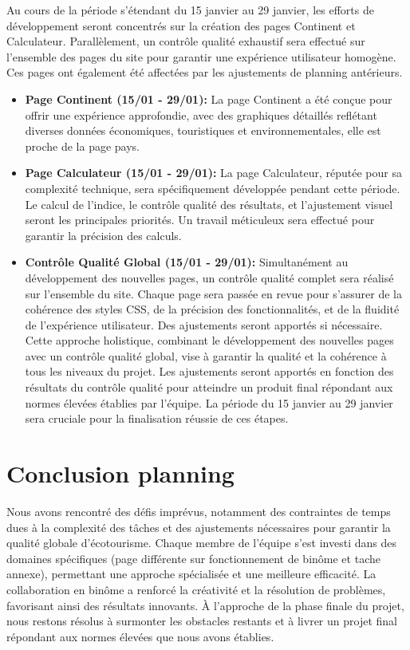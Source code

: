 \documentclass[mstat,12pt]{unswthesis}
\begin{document}
\begin{adjustwidth}{-2cm}{}
Au cours de la période s'étendant du 15 janvier au 29 janvier, les
efforts de développement seront concentrés sur la création des pages
Continent et Calculateur. Parallèlement, un contrôle qualité exhaustif
sera effectué sur l'ensemble des pages du site pour garantir une
expérience utilisateur homogène. Ces pages ont également été affectées
par les ajustements de planning antérieurs.

\begin{itemize}
\tightlist
\item
  \textbf{Page Continent (15/01 - 29/01):} La page Continent a été
  conçue pour offrir une expérience approfondie, avec des graphiques
  détaillés reflétant diverses données économiques, touristiques et
  environnementales, elle est proche de la page pays.
\item
  \textbf{Page Calculateur (15/01 - 29/01):} La page Calculateur,
  réputée pour sa complexité technique, sera spécifiquement développée
  pendant cette période. Le calcul de l'indice, le contrôle qualité des
  résultats, et l'ajustement visuel seront les principales priorités. Un
  travail méticuleux sera effectué pour garantir la précision des
  calculs.
\item
  \textbf{Contrôle Qualité Global (15/01 - 29/01):} Simultanément au
  développement des nouvelles pages, un contrôle qualité complet sera
  réalisé sur l'ensemble du site. Chaque page sera passée en revue pour
  s'assurer de la cohérence des styles CSS, de la précision des
  fonctionnalités, et de la fluidité de l'expérience utilisateur. Des
  ajustements seront apportés si nécessaire. Cette approche holistique,
  combinant le développement des nouvelles pages avec un contrôle
  qualité global, vise à garantir la qualité et la cohérence à tous les
  niveaux du projet. Les ajustements seront apportés en fonction des
  résultats du contrôle qualité pour atteindre un produit final
  répondant aux normes élevées établies par l'équipe. La période du 15
  janvier au 29 janvier sera cruciale pour la finalisation réussie de
  ces étapes.
\end{itemize}

\hypertarget{conclusion-planning}{%
\section{Conclusion planning}\label{conclusion-planning}}

Nous avons rencontré des défis imprévus, notamment des contraintes de
temps dues à la complexité des tâches et des ajustements nécessaires
pour garantir la qualité globale d'écotourisme. Chaque membre de
l'équipe s'est investi dans des domaines spécifiques (page différente
sur fonctionnement de binôme et tache annexe), permettant une approche
spécialisée et une meilleure efficacité. La collaboration en binôme a
renforcé la créativité et la résolution de problèmes, favorisant ainsi
des résultats innovants. À l'approche de la phase finale du projet, nous
restons résolus à surmonter les obstacles restants et à livrer un projet
final répondant aux normes élevées que nous avons établies.


\end{adjustwidth}
\end{document}
